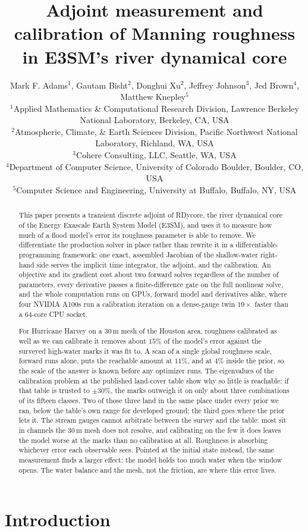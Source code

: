 \documentclass[11pt]{article}
\title{Adjoint measurement and calibration of Manning roughness in
E3SM's river dynamical core}
\author{Mark F. Adams$^1$, Gautam Bisht$^2$, Donghui Xu$^2$, Jeffrey
Johnson$^3$, Jed Brown$^4$, Matthew Knepley$^5$\\[2pt]
\footnotesize $^1$Applied Mathematics \& Computational Research Division,
Lawrence Berkeley National Laboratory, Berkeley, CA, USA\\
\footnotesize $^2$Atmospheric, Climate, \& Earth Sciences Division, Pacific
Northwest National Laboratory, Richland, WA, USA\\
\footnotesize $^3$Cohere Consulting, LLC, Seattle, WA, USA\\
\footnotesize $^4$Department of Computer Science, University of Colorado
Boulder, Boulder, CO, USA\\
\footnotesize $^5$Computer Science and Engineering, University at Buffalo,
Buffalo, NY, USA}
\date{}
\begin{document}
\maketitle

\begin{abstract}
This paper presents a transient discrete adjoint of RDycore, the river
dynamical core of the Energy Exascale Earth System Model (E3SM), and
uses it to measure how much of a flood model's error its roughness
parameter is able to remove. We differentiate the production solver in
place rather than rewrite it in a differentiable-programming
framework: one exact, assembled Jacobian of the shallow-water
right-hand side serves the implicit time integrator, the adjoint, and
the calibration. An objective and its gradient cost about two forward
solves regardless of the number of parameters, every derivative passes
a finite-difference gate on the full nonlinear solve, and the whole
computation runs on GPUs, forward model and derivatives alike, where
four NVIDIA A100s run a calibration iteration on a dense-gauge twin
$19\times$ faster than a 64-core CPU socket.

For Hurricane Harvey on a 30\,m mesh of the Houston area, roughness
calibrated as well as we can calibrate it removes about $15\%$ of the
model's error against the surveyed high-water marks it was fit to. A
scan of a single global roughness scale, forward runs alone, puts the
reachable amount at $11\%$, and at $4\%$ inside the prior, so the scale
of the answer is known before any optimizer runs. The eigenvalues of the
calibration problem at the published land-cover table show why so
little is reachable: if that table is trusted to $\pm 30\%$, the marks
outweigh it on only about three combinations of its fifteen classes.
Two of those three land in the same place under every prior we ran,
below the table's own range for developed ground; the third goes where
the prior lets it. The stream gauges cannot arbitrate between the
survey and the table: most sit in channels the 30\,m mesh does not
resolve, and calibrating on the few it does leaves the model worse at
the marks than no calibration at all. Roughness is absorbing whichever
error each observable sees. Pointed at the initial state instead, the same
measurement finds a larger effect: the model holds too much water when
the window opens. The water balance and the mesh, not the friction,
are where this error lives.
\end{abstract}

\section{Introduction}
\end{document}
